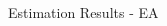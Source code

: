 \documentclass[final]{beamer}
\begin{document}
\begin{frame}
\begin{columns}[t]
\begin{column}{.53 \linewidth}
\begin{columns}[c]
\begin{column}{.48 \linewidth}
\begin{block}{Estimation Results - EA}

\end{block}
\end{column}
\end{columns}
\end{column}
\end{columns}
\end{frame}
\end{document}
